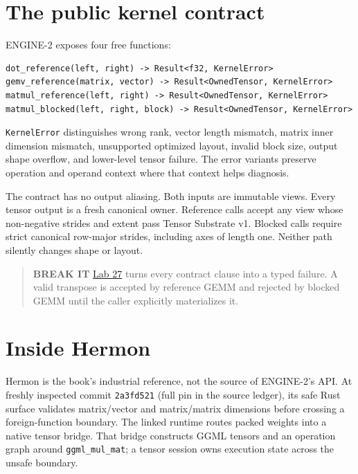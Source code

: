 \section{The public kernel
contract}\label{the-public-kernel-contract}

ENGINE-2 exposes four free functions:

\begin{verbatim}
dot_reference(left, right) -> Result<f32, KernelError>
gemv_reference(matrix, vector) -> Result<OwnedTensor, KernelError>
matmul_reference(left, right) -> Result<OwnedTensor, KernelError>
matmul_blocked(left, right, block) -> Result<OwnedTensor, KernelError>
\end{verbatim}

\texttt{KernelError} distinguishes wrong rank, vector length mismatch,
matrix inner dimension mismatch, unsupported optimized layout, invalid
block size, output shape overflow, and lower-level tensor failure. The
error variants preserve operation and operand context where that context
helps diagnosis.

The contract has no output aliasing. Both inputs are immutable views.
Every tensor output is a fresh canonical owner. Reference calls accept
any view whose non-negative strides and extent pass Tensor Substrate v1.
Blocked calls require strict canonical row-major strides, including axes
of length one. Neither path silently changes shape or layout.

\begin{quote}
\textbf{BREAK IT}
\href{https://github.com/hermonai/inside-the-llm-engine/blob/astra-visual-rewrite/labs/lab-27-break-the-kernel.md}{Lab
27} turns every contract clause into a typed failure. A valid transpose
is accepted by reference GEMM and rejected by blocked GEMM until the
caller explicitly materializes it.
\end{quote}

\section{Inside Hermon}\label{inside-hermon-2}

Hermon is the book's industrial reference, not the source of ENGINE-2's
API. At freshly inspected commit \texttt{2a3fd521} (full pin in the
source ledger), its safe Rust surface validates matrix/vector and
matrix/matrix dimensions before crossing a foreign-function boundary.
The linked runtime routes packed weights into a native tensor bridge.
That bridge constructs GGML tensors and an operation graph around
\texttt{ggml\_mul\_mat}; a tensor session owns execution state across
the unsafe boundary.

